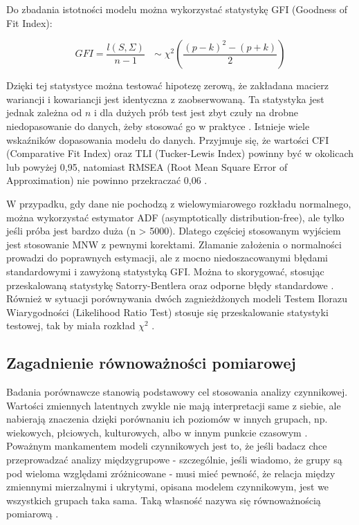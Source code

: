 \documentclass[12pt]{article}
\begin{document}
Do zbadania istotności modelu można wykorzystać statystykę GFI (Goodness of Fit Index):

\begin{equation}
\label{eq:gfi}
GFI = \frac{l(S, \Sigma)}{n-1} \text{   } \sim \chi^2 (\frac{(p-k)^2 - (p+k)}{2})
\end{equation}

Dzięki tej statystyce można testować hipotezę zerową, że zakładana macierz wariancji i kowariancji jest identyczna z zaobserwowaną. Ta statystyka jest jednak zależna od \(n\) i dla dużych prób test jest zbyt czuły na drobne niedopasowanie do danych, żeby stosować go w praktyce \citep{CheungRens}. Istnieje wiele wskaźników dopasowania modelu do danych. Przyjmuje się, że wartości CFI (Comparative Fit Index) oraz TLI (Tucker-Lewis Index) powinny być w okolicach lub powyżej 0,95, natomiast RMSEA (Root Mean Square Error of Approximation) nie powinno przekraczać 0,06 \citep{HuBentler}.

W przypadku, gdy dane nie pochodzą z wielowymiarowego rozkładu normalnego, można wykorzystać estymator ADF (asymptotically distribution-free), ale tylko jeśli próba jest bardzo duża (n \textgreater{} 5000). Dlatego częściej stosowanym wyjściem jest stosowanie MNW z pewnymi korektami. Złamanie założenia o normalności prowadzi do poprawnych estymacji, ale z mocno niedoszacowanymi błędami standardowymi i zawyżoną statystyką GFI. Można to skorygować, stosując przeskalowaną statystykę Satorry-Bentlera oraz odporne błędy standardowe \citep{Rosseel}. Również w sytuacji porównywania dwóch zagnieżdżonych modeli Testem Ilorazu Wiarygodności (Likelihood Ratio Test) stosuje się przeskalowanie statystyki testowej, tak by miała rozkład \(\chi^2\) \citep{SatorraBentler}.

\hypertarget{zagadnienie-ruxf3wnowaux17cnoux15bci-pomiarowej}{%
\subsection{Zagadnienie równoważności pomiarowej}\label{zagadnienie-ruxf3wnowaux17cnoux15bci-pomiarowej}}

Badania porównawcze stanowią podstawowy cel stosowania analizy czynnikowej. Wartości zmiennych latentnych zwykle nie mają interpretacji same z siebie, ale nabierają znaczenia dzięki porównaniu ich poziomów w innych grupach, np. wiekowych, płciowych, kulturowych, albo w innym punkcie czasowym \citep{Pokropek}. Poważnym mankamentem modeli czynnikowych jest to, że jeśli badacz chce przeprowadzać analizy międzygrupowe - szczególnie, jeśli wiadomo, że grupy są pod wieloma względami zróżnicowane - musi mieć pewność, że relacja między zmiennymi mierzalnymi i ukrytymi, opisana modelem czynnikowym, jest we wszystkich grupach taka sama. Taką własność nazywa się równoważnością pomiarową \citep{ChenEtAl}.
\end{document}
